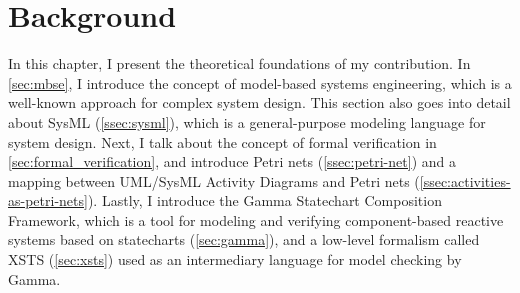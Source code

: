 \chapter{Background}\label{ch:background}

In this chapter, I present the theoretical foundations of my contribution. In \autoref{sec:mbse}, I introduce the concept of model-based systems engineering, which is a well-known approach for complex system design. This section also goes into detail about SysML (\autoref{ssec:sysml}), which is a general-purpose modeling language for system design. Next, I talk about the concept of formal verification in \autoref{sec:formal_verification}, and introduce Petri nets (\autoref{ssec:petri-net}) and a mapping between UML/SysML Activity Diagrams and Petri nets (\autoref{ssec:activities-as-petri-nets}). Lastly, I introduce the Gamma Statechart Composition Framework, which is a tool for modeling and verifying component-based reactive systems based on statecharts (\autoref{sec:gamma}), and a low-level formalism called XSTS (\autoref{sec:xsts}) used as an intermediary language for model checking by Gamma.


%




